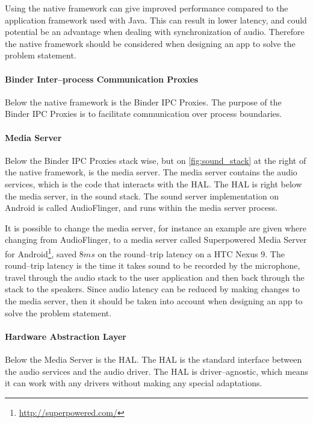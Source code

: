 Using the native framework can give improved performance compared to the application framework used with Java\cite{nat_perf_2}.
This can result in lower latency, and could potential be an advantage when dealing with synchronization of audio.
Therefore the native framework should be considered when designing an app to solve the problem statement.

\paragraph{Binder Inter--process Communication Proxies}%
Below the native framework is the Binder \ac{IPC} Proxies.
The purpose of the Binder \ac{IPC} Proxies is to facilitate communication over process boundaries.

\paragraph{Media Server}
Below the Binder \ac{IPC} Proxies stack wise, but on \cref{fig:sound_stack} at the right of the native framework, is the media server.
The media server contains the audio services, which is the code that interacts with the \ac{HAL}.
The \ac{HAL} is right below the media server, in the sound stack.
The sound server implementation on Android is called AudioFlinger, and runs within the media server process\cite{audioflinger}.

It is possible to change the media server, 
for instance an example are given where changing from AudioFlinger, to a media server called Superpowered Media Server for Android\footnote{\url{http://superpowered.com/}}, saved $8 ms$ on the round--trip latency on a HTC Nexus 9\cite{superpowered_8ms}.
The round--trip latency is the time it takes sound to be recorded by the microphone,
travel through the audio stack to the user application and then back through the stack to the speakers\cite{superpowered_8ms}.
Since audio latency can be reduced by making changes to the media server,
then it should be taken into account when designing an app to solve the problem statement.

\paragraph{Hardware Abstraction Layer}
Below the Media Server is the \ac{HAL}.
The \ac{HAL} is the standard interface between the audio services and the audio driver.
The \ac{HAL} is driver--agnostic, which means it can work with any drivers without making any special adaptations.

